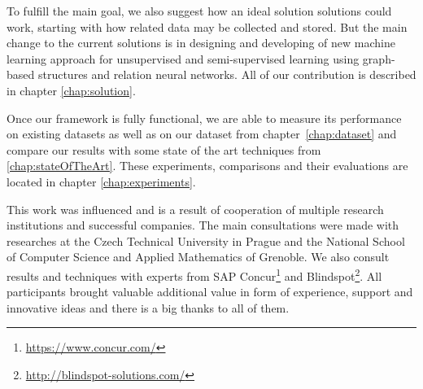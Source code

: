To fulfill the main goal, we also suggest how an ideal solution solutions could work, starting with how related data may be collected and stored. But the main change to the current solutions is in designing and developing of new machine learning approach for unsupervised and semi-supervised learning using graph-based structures and relation neural networks. All of our contribution is described in chapter \ref{chap:solution}.

Once our framework is fully functional, we are able to measure its performance on existing datasets as well as on our dataset from chapter~\ref{chap:dataset} and compare our results with some state of the art techniques from \ref{chap:stateOfTheArt}. These experiments, comparisons and their evaluations are located in chapter \ref{chap:experiments}.

This work was influenced and is a result of cooperation of multiple research institutions and successful companies. The main consultations were made with researches at the Czech Technical University in Prague and the National School of Computer Science and Applied Mathematics of Grenoble. We also consult results and techniques with experts from SAP Concur\footnote{\url{https://www.concur.com/}} and Blindspot\footnote{\url{http://blindspot-solutions.com/}}. All participants brought valuable additional value in form of experience, support and innovative ideas and there is a big thanks to all of them.  


